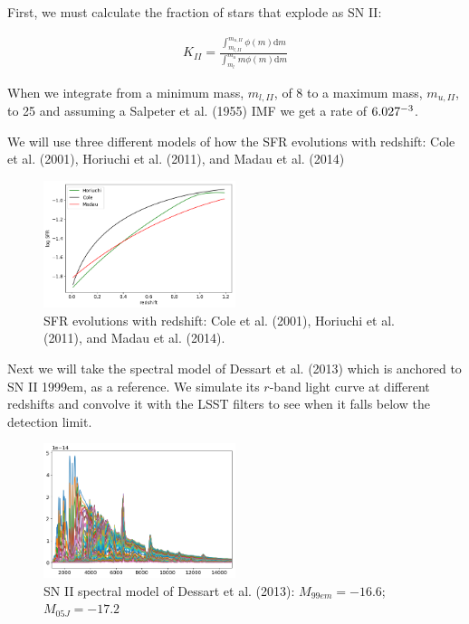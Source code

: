 \documentclass[12pt, onecolumn]{emulateapj}
\begin{document}
First, we must calculate the fraction of stars that explode as SN II:

\begin{align}
\label{eq:rateII}
K_{II} = \frac{\int_{m_{l,II}}^{m_{u,II}} \phi(m) \mathrm{d}m}{\int_{m_{l}}^{m_{u}} m\phi(m) \mathrm{d}m}
\end{align}

When we integrate from a minimum mass, $m_{l,II}$, of 8 to a maximum mass, $m_{u,II}$, to 25 and assuming a Salpeter et al. (1955) IMF we get a rate of $6.027 \time 10^{-3}$.

We will use three different models of how the SFR evolutions with redshift: Cole et al. (2001), Horiuchi et al. (2011), and Madau et al. (2014)

\begin{figure}
	\begin{center}
		\includegraphics[width=0.5\textwidth]{SNII_SFR.png}
		\caption{SFR evolutions with redshift: Cole et al. (2001), Horiuchi et al. (2011), and Madau et al. (2014).}
		\label{fig:SNII_SFR}
	\end{center}
\end{figure}

Next we will take the spectral model of Dessart et al. (2013) which is anchored to SN II 1999em, as a reference. We simulate its $r$-band light curve at different redshifts and convolve it with the LSST filters to see when it falls below the detection limit.

\begin{figure}
	\begin{center}
		\includegraphics[width=0.5\textwidth]{spectral_model_SNII.png}
		\caption{SN II spectral model of Dessart et al. (2013): $M_{99em}=-16.6$; $M_{05J}=-17.2$}
		\label{fig:SNII_lc}
	\end{center}
\end{figure}
\end{document}
